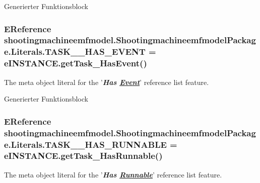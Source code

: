 Generierter Funktionsblock \hypertarget{interfaceshootingmachineemfmodel_1_1_shootingmachineemfmodel_package_1_1_literals_a3ce372c79cc7d3893756d575f849f232}{
\subsubsection[{T\-A\-S\-K\-\_\-\-\_\-\-H\-A\-S\-\_\-\-E\-V\-E\-N\-T}]{\setlength{\rightskip}{0pt plus 5cm}E\-Reference shootingmachineemfmodel.\-Shootingmachineemfmodel\-Package.\-Literals.\-T\-A\-S\-K\-\_\-\-\_\-\-H\-A\-S\-\_\-\-E\-V\-E\-N\-T = e\-I\-N\-S\-T\-A\-N\-C\-E.\-get\-Task\-\_\-\-Has\-Event()}}\label{interfaceshootingmachineemfmodel_1_1_shootingmachineemfmodel_package_1_1_literals_a3ce372c79cc7d3893756d575f849f232}
The meta object literal for the '{\itshape {\bfseries Has \hyperlink{interfaceshootingmachineemfmodel_1_1_event}{Event}}}' reference list feature.

Generierter Funktionsblock \hypertarget{interfaceshootingmachineemfmodel_1_1_shootingmachineemfmodel_package_1_1_literals_a8179b43f089e2fe704940ce814273d02}{
\subsubsection[{T\-A\-S\-K\-\_\-\-\_\-\-H\-A\-S\-\_\-\-R\-U\-N\-N\-A\-B\-L\-E}]{\setlength{\rightskip}{0pt plus 5cm}E\-Reference shootingmachineemfmodel.\-Shootingmachineemfmodel\-Package.\-Literals.\-T\-A\-S\-K\-\_\-\-\_\-\-H\-A\-S\-\_\-\-R\-U\-N\-N\-A\-B\-L\-E = e\-I\-N\-S\-T\-A\-N\-C\-E.\-get\-Task\-\_\-\-Has\-Runnable()}}\label{interfaceshootingmachineemfmodel_1_1_shootingmachineemfmodel_package_1_1_literals_a8179b43f089e2fe704940ce814273d02}
The meta object literal for the '{\itshape {\bfseries Has \hyperlink{interfaceshootingmachineemfmodel_1_1_runnable}{Runnable}}}' reference list feature.

